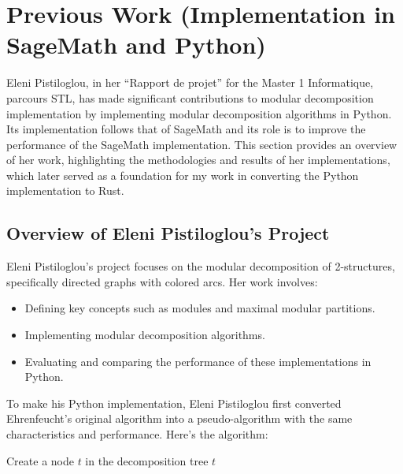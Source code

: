 
\chapter{Previous Work (Implementation in SageMath and Python)}\label{ch:previous-work-(implementation-in-sagemath-and-python)}


Eleni Pistiloglou, in her ``Rapport de projet'' for the Master 1 Informatique, parcours STL, has made significant contributions to modular decomposition implementation by implementing modular decomposition algorithms in Python.
Its implementation follows that of SageMath and its role is to improve the performance of the SageMath implementation.
This section provides an overview of her work, highlighting the methodologies and results of her implementations, which later served as a foundation for my work in converting the Python implementation to Rust.

\section{Overview of Eleni Pistiloglou's Project}\label{sec:overview-of-eleni-pistiloglou's-project}

Eleni Pistiloglou's project focuses on the modular decomposition of 2-structures, specifically directed graphs with colored arcs.
Her work involves:
\begin{itemize}
    \item Defining key concepts such as modules and maximal modular partitions.
    \item Implementing modular decomposition algorithms.
    \item Evaluating and comparing the performance of these implementations in Python.
\end{itemize}


To make his Python implementation, Eleni Pistiloglou first converted Ehrenfeucht's original algorithm into a pseudo-algorithm with the same characteristics and performance.
Here's the algorithm:

\begin{algorithm}
    \begin{algorithmic}
            \State Create a node $t$ in the decomposition tree
            \State {}
            \State \Return $t$
        \EndFunction
    \end{algorithmic}\label{alg:modular-decomposition}
\end{algorithm}

